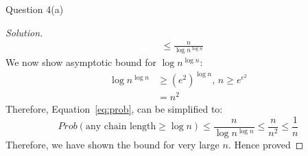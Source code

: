 \begin{solution}{Question 4(a)}
\begin{proof}[Solution]
\begin{equation}
\begin{split}
                                                     &\leq \frac{n}{\log{n}^{\log{n}}}
            \end{split}
        \end{equation}
        We now show asymptotic bound for $\log{n}^{\log{n}}$:
        \begin{equation}
            \begin{split}
                \log{n}^{\log{n}} &\geq (e^2)^{\log{n}}\text{, }n \geq e^{e^2}\\
                                &= n^2
            \end{split}
        \end{equation}
        Therefore, Equation~\ref{eq:prob}, can be simplified to:
        \begin{equation}
            Prob(\text{any chain length} \geq \log{n}) \leq \frac{n}{\log{n}^{\log{n}}} \leq \frac{n}{n^2} \leq \frac{1}{n}
        \end{equation}
        Therefore, we have shown the bound for very large $n$. Hence proved

    \end{proof}
\end{solution}
